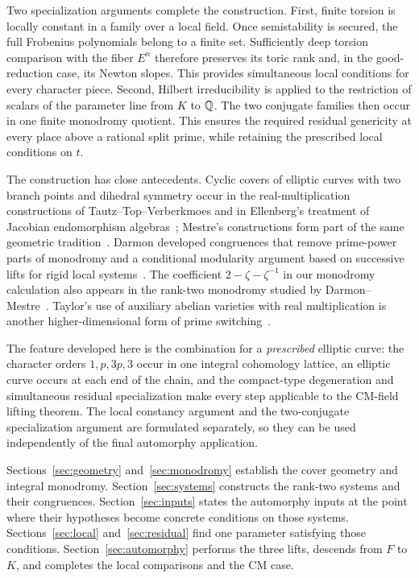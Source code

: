 Two specialization arguments complete the construction. First, finite
torsion is locally constant in a family over a local field. Once
semistability is secured, the full Frobenius polynomials belong to a
finite set. Sufficiently deep torsion comparison with the fiber $E^n$
therefore preserves its toric rank and, in the good-reduction case, its
Newton slopes. This provides simultaneous local conditions for every
character piece. Second, Hilbert irreducibility is applied to the
restriction of scalars of the parameter line from $K$ to $\mathbb Q$. The two
conjugate families then occur in one finite monodromy quotient. This
ensures the required residual genericity at every place above a rational
split prime, while retaining the prescribed local conditions on $t$.

The construction has close antecedents. Cyclic covers of elliptic
curves with two branch points and dihedral symmetry occur in the
real-multiplication constructions of Tautz--Top--Verberkmoes and in
Ellenberg's treatment of Jacobian endomorphism
algebras~\cite{TTV,Ellenberg}; Mestre's constructions form part of the
same geometric tradition~\cite{Mestre}. Darmon developed congruences that
remove prime-power parts of monodromy and a conditional modularity
argument based on successive lifts for rigid local
systems~\cite{Darmon1999,Darmon2000}.
The coefficient $2-\zeta-\zeta^{-1}$ in our monodromy calculation also
appears in the rank-two monodromy studied by
Darmon--Mestre~\cite{DarmonMestre}. Taylor's use of auxiliary
abelian varieties with real multiplication is another higher-dimensional
form of prime switching~\cite{Taylor2002}.

The feature developed here is the combination for a \emph{prescribed}
elliptic curve: the character orders $1,p,3p,3$ occur in one integral
cohomology lattice, an elliptic curve occurs at each end of the chain,
and the compact-type degeneration and simultaneous residual specialization
make every step applicable to the CM-field lifting theorem. The local
constancy argument and the two-conjugate specialization argument are
formulated separately, so they can be used independently of the final
automorphy application.

Sections~\ref{sec:geometry} and~\ref{sec:monodromy} establish the cover
geometry and integral monodromy. Section~\ref{sec:systems} constructs the
rank-two systems and their congruences. Section~\ref{sec:inputs} states the
automorphy inputs at the point where their hypotheses become concrete
conditions on those systems. Sections~\ref{sec:local}
and~\ref{sec:residual} find one parameter satisfying those conditions.
Section~\ref{sec:automorphy} performs the three lifts, descends from $F$
to $K$, and completes the local comparisons and the CM case.

